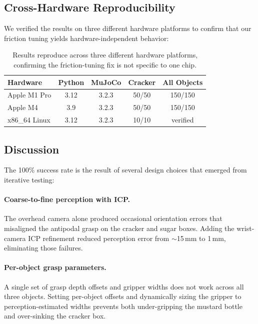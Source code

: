 \documentclass[11pt]{article}
\begin{document}
\subsection{Cross-Hardware Reproducibility}

We verified the results on three different hardware platforms to confirm
that our friction tuning yields hardware-independent behavior:

\begin{table}[h]
\centering
\begin{tabular}{lcccc}
\toprule
Hardware & Python & MuJoCo & Cracker & All Objects \\
\midrule
Apple M1 Pro       & 3.12 & 3.2.3 & 50/50 & 150/150 \\
Apple M4           & 3.9  & 3.2.3 & 50/50 & 150/150 \\
x86\_64 Linux      & 3.12 & 3.2.3 & 10/10 & verified \\
\bottomrule
\end{tabular}
\caption{Results reproduce across three different hardware platforms,
confirming the friction-tuning fix is not specific to one chip.}
\label{tab:hardware}
\end{table}

\subsection{Discussion}

The 100\% success rate is the result of several design choices that
emerged from iterative testing:

\paragraph{Coarse-to-fine perception with ICP.}
The overhead camera alone produced occasional orientation errors that
misaligned the antipodal grasp on the cracker and sugar boxes. Adding
the wrist-camera ICP refinement reduced perception error from $\sim$15\,mm
to 1\,mm, eliminating those failures.

\paragraph{Per-object grasp parameters.}
A single set of grasp depth offsets and gripper widths does not work
across all three objects. Setting per-object offsets and dynamically
sizing the gripper to perception-estimated widths prevents both
under-gripping the mustard bottle and over-sinking the cracker box.
\end{document}
